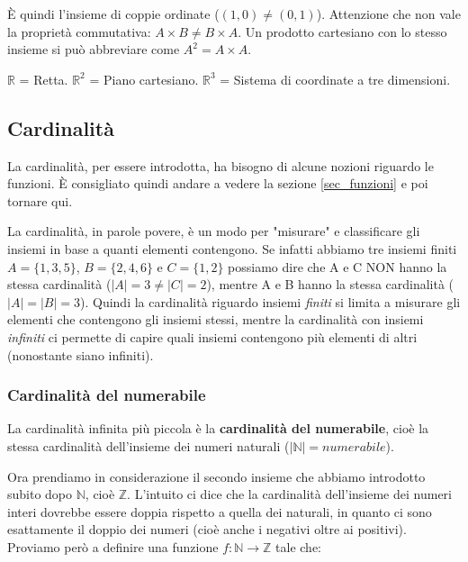 È quindi l'insieme di coppie ordinate ($(1, 0) \neq (0, 1)$). Attenzione che non vale la proprietà commutativa: $A\times B \neq B\times A$. Un prodotto cartesiano con lo stesso insieme si può abbreviare come $A^2 = A\times A$.\bigbreak 

$\mathbb{R}$ = Retta. $\mathbb{R}^2$ = Piano cartesiano. $\mathbb{R}^3$ = Sistema di coordinate a tre dimensioni. %

\subsection{Cardinalità}
La cardinalità, per essere introdotta, ha bisogno di alcune nozioni riguardo le funzioni. È consigliato quindi andare a vedere la sezione \ref{sec_funzioni} e poi tornare qui.\bigbreak



La cardinalità, in parole povere, è un modo per "misurare" e classificare gli insiemi in base a quanti elementi contengono. Se infatti abbiamo tre insiemi finiti $A=\{1, 3, 5\}$, $B=\{2, 4, 6\}$ e $C=\{1, 2\}$ possiamo dire che A e C NON hanno la stessa cardinalità ($|A|=3 \neq |C| = 2$), mentre A e B hanno la stessa cardinalità ($|A| = |B| = 3$). Quindi la cardinalità riguardo insiemi \textit{finiti} si limita a misurare gli elementi che contengono gli insiemi stessi, mentre la cardinalità con insiemi \textit{infiniti} ci permette di capire quali insiemi contengono più elementi di altri (nonostante siano infiniti).\bigbreak

\subsubsection{Cardinalità del numerabile}
La cardinalità infinita più piccola è la \textbf{cardinalità del numerabile}, cioè la stessa cardinalità dell'insieme dei numeri naturali ($|\mathbb{N}| = numerabile$).

Ora prendiamo in considerazione il secondo insieme che abbiamo introdotto subito dopo $\mathbb{N}$, cioè $\mathbb{Z}.$ L'intuito ci dice che la cardinalità dell'insieme dei numeri interi dovrebbe essere doppia rispetto a quella dei naturali, in quanto ci sono esattamente il doppio dei numeri (cioè anche i negativi oltre ai positivi). Proviamo però a definire una funzione $f: \mathbb{N} \to \mathbb{Z}$ tale che:

